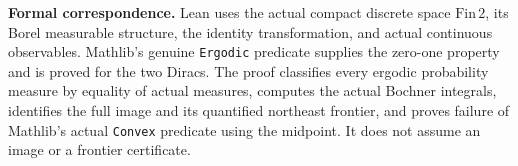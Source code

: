 \documentclass[11pt]{article}
\begin{document}
\medskip
\noindent\textbf{Formal correspondence.} Lean uses the actual compact discrete space $\mathrm{Fin}\,2$, its Borel measurable structure, the identity transformation, and actual continuous observables. Mathlib's genuine \texttt{Ergodic} predicate supplies the zero-one property and is proved for the two Diracs. The proof classifies every ergodic probability measure by equality of actual measures, computes the actual Bochner integrals, identifies the full image and its quantified northeast frontier, and proves failure of Mathlib's actual \texttt{Convex} predicate using the midpoint. It does not assume an image or a frontier certificate.
\end{document}
